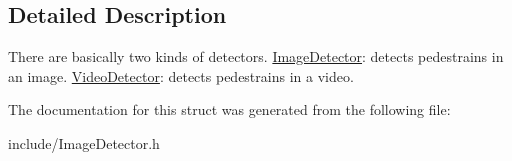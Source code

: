 \subsection{Detailed Description}
There are basically two kinds of detectors. \hyperlink{classImageDetector}{Image\+Detector}\+: detects pedestrains in an image. \hyperlink{classVideoDetector}{Video\+Detector}\+: detects pedestrains in a video. 

The documentation for this struct was generated from the following file\+:\begin{DoxyCompactItemize}
\item 
include/Image\+Detector.\+h\end{DoxyCompactItemize}
